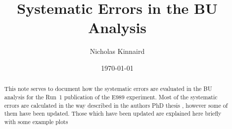 \documentclass[12pt,letterpaper]{article}
\title{Systematic Errors in the BU Analysis}
\author{Nicholas Kinnaird}
\date{\today}
\begin{document}
\maketitle

\begin{abstract}
	This note serves to document how the systematic errors are evaluated in the BU analysis for the Run~1 publication of the E989 experiment. Most of the systematic errors are calculated in the way described in the authors PhD thesis \cite{phdthesis:2020Kinnaird}, however some of them have been updated. Those which have been updated are explained here briefly with some example plots
\end{abstract}














\printbibliography

\end{document}
